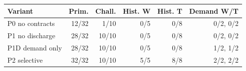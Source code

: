 \begin{tabular}{@{}lrrrrr@{}}
\toprule
Variant & Prim. & Chall. & Hist. W & Hist. T & Demand W/T \\
\midrule
P0 no contracts & 12/32 & 1/10 & 0/5 & 0/8 & 0/2, 0/2 \\
P1 no discharge & 28/32 & 10/10 & 0/5 & 0/8 & 0/2, 0/2 \\
P1D demand only & 28/32 & 10/10 & 0/5 & 0/8 & 1/2, 1/2 \\
P2 selective & 32/32 & 10/10 & 5/5 & 8/8 & 2/2, 2/2 \\
\bottomrule
\end{tabular}

